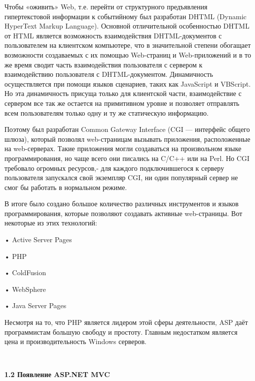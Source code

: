 \documentclass[14pt,a4paper]{extreport}
\begin{document}
	Чтобы «оживить» Web, т.е. перейти от структурного предъявления гипертекстовой информации к событийному был разработан DHTML (Dynamic HyperText Markup Language). Основной отличительной особенностью DHTML от HTML является возможность взаимодействия DHTML-документов с пользователем на клиентском компьютере, что в значительной степени обогащает возможности создаваемых с их помощью Web-страниц и Web-приложений и в то же время сводит часть взаимодействия пользователя с сервером к взаимодействию пользователя с DHTML-документом.
	Динамичность осуществляется при помощи языков сценариев, таких как JavaScript и VBScript. Но эта динамичность присуща только для клиентской части, взаимодействие с сервером все так же остается на примитивном уровне и позволяет отправлять всем пользователям только одну и ту же статическую информацию.\par 
	Поэтому был разработан Common Gateway Interface (CGI — интерфейс общего шлюза), который позволял web-страницам вызывать приложения, расположенные на web-серверах. Такие приложения могли создаваться на произвольном языке программирования, но чаще всего они писались на C/C++ или на Perl. Но CGI требовало огромных ресурсов,- для каждого подключившегося к серверу пользователя запускался свой экземпляр CGI, ни один популярный сервер не смог бы работать в нормальном режиме.\par
	В итоге было создано большое количество различных инструментов и языков программирования, которые позволяют создавать активные web-страницы. Вот некоторые из этих технологий:\par
	• Active Server Pages\par
	• PHP\par
	• ColdFusion\par
	• WebSphere\par
	• Java Server Pages\par	
	Несмотря на то, что PHP является лидером этой сферы деятельности, ASP даёт программистам большую свободу и простоту. Главным недостатком является цена и производительность Windows серверов.\par
	~\\

	\textbf{1.2 Появление ASP.NET MVC}
\end{document}
